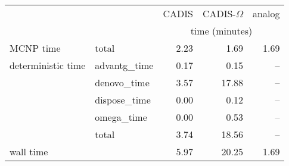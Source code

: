 \begin{tabular}{llrrr}
\toprule
          &             &          CADIS & CADIS-$\Omega$ &         analog \\
        &              & \multicolumn{3}{c}{time (minutes)} \\
\midrule
MCNP time & total &           2.23 &           1.69 &           1.69 \\
deterministic time & advantg\_time &           0.17 &           0.15 &            -- \\
          & denovo\_time &           3.57 &          17.88 &            -- \\
          & dispose\_time &           0.00 &           0.12 &            -- \\
          & omega\_time &           0.00 &           0.53 &            -- \\
          & total &           3.74 &          18.56 &            -- \\
wall time &              &           5.97 &          20.25 &           1.69 \\
\bottomrule
\end{tabular}
